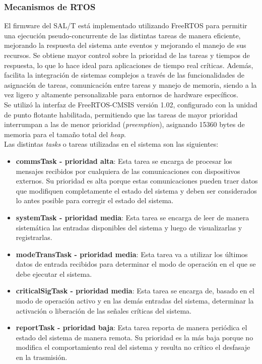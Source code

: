 \subsubsection{Mecanismos de RTOS}

El firmware del SAL/T está implementado utilizando FreeRTOS \cite{freertos} para permitir una ejecución pseudo-concurrente de las distintas tareas de manera eficiente, mejorando la respuesta del sistema ante eventos y mejorando el manejo de sus recursos. Se obtiene mayor control sobre la prioridad de las tareas y tiempos de respuesta, lo que lo hace ideal para aplicaciones de tiempo real críticas. Además, facilita la integración de sistemas complejos a través de las funcionalidades de asignación de tareas, comunicación entre tareas y manejo de memoria, siendo a la vez ligero y altamente personalizable para entornos de hardware específicos. \\ 


Se utilizó la interfaz de FreeRTOS-CMSIS versión 1.02, configurado con la unidad de punto flotante habilitada, permitiendo que las tareas de mayor prioridad interrumpan a las de menor prioridad (\textit{preemption}), asignando 15360 bytes de memoria para el tamaño total del \textit{heap}. \\

Las distintas \textit{tasks} o tareas utilizadas en el sistema son las siguientes: 

\begin{itemize}
    \item \textbf{commsTask - prioridad alta}: Esta tarea se encarga de procesar los mensajes recibidos por cualquiera de las comunicaciones con dispositivos externos. Su prioridad es alta porque estas comunicaciones pueden traer datos que modifiquen completamente el estado del sistema y deben ser considerados lo antes posible para corregir el estado del sistema. 
    \item \textbf{systemTask - prioridad media}: Esta tarea se encarga de leer de manera sistemática las entradas disponibles del sistema y luego de visualizarlas y registrarlas. 
    \item \textbf{modeTransTask - prioridad media}: Esta tarea va a utilizar los últimos datos de entrada recibidos para determinar el modo de operación en el que se debe ejecutar el sistema.
    \item \textbf{criticalSigTask - prioridad media}: Esta tarea se encarga de, basado en el modo de operación activo y en las demás entradas del sistema, determinar la activación o liberación de las señales críticas del sistema. 
    \item \textbf{reportTask - prioridad baja}: Esta tarea reporta de manera periódica el estado del sistema de manera remota. Su prioridad es la más baja porque no modifica el comportamiento real del sistema y resulta no crítico el desfasaje en la trasmisión. 
\end{itemize}


